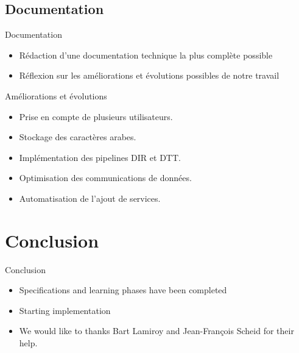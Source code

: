 \documentclass[c]{beamer}
\begin{document}
\subsection{Documentation}
\begin{frame}
    \begin{block}{Documentation}
        \begin{itemize}
            \item Rédaction d'une documentation technique la plus complète possible
            \item Réflexion sur les améliorations et évolutions possibles de notre travail
        \end{itemize}
    \end{block}
    \begin{block}{Améliorations et évolutions}
        \begin{itemize}
            \item Prise en compte de plusieurs utilisateurs.
            \item Stockage des caractères arabes.
            \item Implémentation des pipelines DIR et DTT.
            \item Optimisation des communications de données.
            \item Automatisation de l'ajout de services.
        \end{itemize}
    \end{block}
\end{frame}
\section{Conclusion}
\begin{frame}
  \begin{block}{Conclusion}
    \begin{itemize}
        \item Specifications and learning phases have been completed
        \item Starting implementation
        \item  We would like to thanks Bart Lamiroy and Jean-François Scheid for their help.
     \end{itemize}
  \end{block}
\end{frame}
\end{document}

